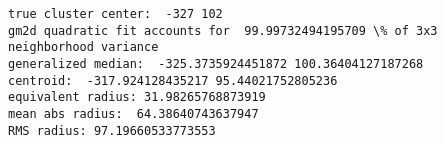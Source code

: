 \documentclass[11pt]{article}
\begin{document}
    \begin{Verbatim}[commandchars=\\\{\}]
true cluster center:  -327 102
gm2d quadratic fit accounts for  99.99732494195709 \% of 3x3 neighborhood variance
generalized median:  -325.3735924451872 100.36404127187268
centroid:  -317.924128435217 95.44021752805236
equivalent radius: 31.98265768873919
mean abs radius:  64.38640743637947
RMS radius: 97.19660533773553

    \end{Verbatim}

    \begin{center}
    \end{center}
    { \hspace*{\fill} \\}
    
\end{document}
